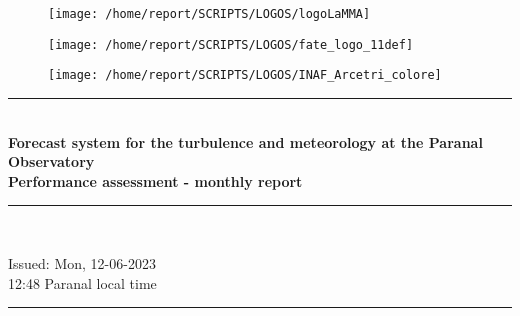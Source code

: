 \documentclass[11pt,english]{article}
\newcommand{\HRule}{\rule{\linewidth}{0.5mm}}
\begin{document}
\begin{figure}
\begin{center}
\hspace{1.5cm}
\parbox{5.5cm}{\texttt{[image: /home/report/SCRIPTS/LOGOS/logoLaMMA]}}
\hspace{.3cm}
\parbox{5.5cm}{\texttt{[image: /home/report/SCRIPTS/LOGOS/fate\_logo\_11def]}}
\hspace{.3cm}
\parbox{5.5cm}{\texttt{[image: /home/report/SCRIPTS/LOGOS/INAF\_Arcetri\_colore]}}
\hspace{.1cm}
\vspace{1.2cm}
\end{center}
\end{figure}

\begin{center}
\HRule \\[0.4cm]
\Huge{\textbf{Forecast system for the turbulence and meteorology at the Paranal Observatory}}
\\[0.4cm]
\LARGE{\textbf{Performance assessment - monthly report}}
\HRule \\[0.4cm]
\end{center}

\begin{center}
\vspace{2cm}\Huge{Issued: Mon, 12-06-2023\\ 12:48 Paranal local time}
\HRule \\[0.1cm]
\end{center}

\clearpage
\end{document}
